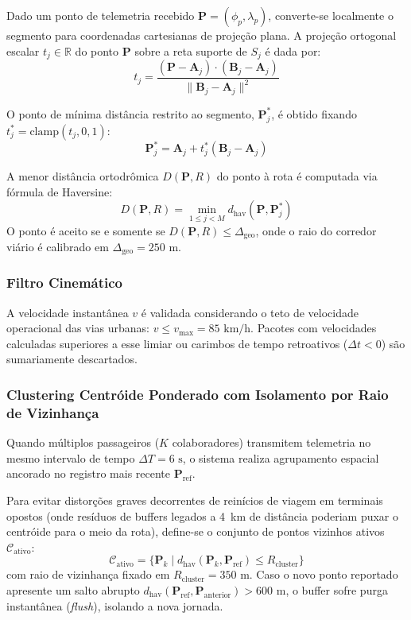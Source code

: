 \documentclass[lettersize,journal]{IEEEtran}
\begin{document}
Dado um ponto de telemetria recebido $\mathbf{P} = (\phi_p, \lambda_p)$, converte-se localmente o segmento para coordenadas cartesianas de projeção plana. A projeção ortogonal escalar $t_j \in \mathbb{R}$ do ponto $\mathbf{P}$ sobre a reta suporte de $S_j$ é dada por:
\begin{equation}
t_j = \frac{(\mathbf{P} - \mathbf{A}_j) \cdot (\mathbf{B}_j - \mathbf{A}_j)}{\|\mathbf{B}_j - \mathbf{A}_j\|^2}
\end{equation}

O ponto de mínima distância restrito ao segmento, $\mathbf{P}^*_j$, é obtido fixando $t^*_j = \text{clamp}(t_j, 0, 1)$:
\begin{equation}
\mathbf{P}^*_j = \mathbf{A}_j + t^*_j (\mathbf{B}_j - \mathbf{A}_j)
\end{equation}

A menor distância ortodrômica $D(\mathbf{P}, R)$ do ponto à rota é computada via fórmula de Haversine:
\begin{equation}
D(\mathbf{P}, R) = \min_{1 \le j < M} d_{\text{hav}}(\mathbf{P}, \mathbf{P}^*_j)
\end{equation}
O ponto é aceito se e somente se $D(\mathbf{P}, R) \le \Delta_{\text{geo}}$, onde o raio do corredor viário é calibrado em $\Delta_{\text{geo}} = 250\text{~m}$.

\subsubsection{Filtro Cinemático}
A velocidade instantânea $v$ é validada considerando o teto de velocidade operacional das vias urbanas: $v \le v_{\text{max}} = 85\text{~km/h}$. Pacotes com velocidades calculadas superiores a esse limiar ou carimbos de tempo retroativos ($\Delta t < 0$) são sumariamente descartados.

\subsubsection{Clustering Centróide Ponderado com Isolamento por Raio de Vizinhança}
Quando múltiplos passageiros ($K$ colaboradores) transmitem telemetria no mesmo intervalo de tempo $\Delta T = 6\text{~s}$, o sistema realiza agrupamento espacial ancorado no registro mais recente $\mathbf{P}_{\text{ref}}$. 

Para evitar distorções graves decorrentes de reinícios de viagem em terminais opostos (onde resíduos de buffers legados a 4~km de distância poderiam puxar o centróide para o meio da rota), define-se o conjunto de pontos vizinhos ativos $\mathcal{C}_{\text{ativo}}$:
\begin{equation}
\mathcal{C}_{\text{ativo}} = \{ \mathbf{P}_k \mid d_{\text{hav}}(\mathbf{P}_k, \mathbf{P}_{\text{ref}}) \le R_{\text{cluster}} \}
\end{equation}
com raio de vizinhança fixado em $R_{\text{cluster}} = 350\text{~m}$. Caso o novo ponto reportado apresente um salto abrupto $d_{\text{hav}}(\mathbf{P}_{\text{ref}}, \mathbf{P}_{\text{anterior}}) > 600\text{~m}$, o buffer sofre purga instantânea (\textit{flush}), isolando a nova jornada.
\end{document}

